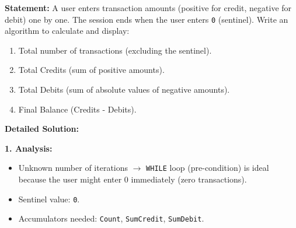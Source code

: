 \documentclass[11pt]{article}
\begin{document}
\begin{exoresolu}
\textbf{Statement:} A user enters transaction amounts (positive for credit, negative for debit) one by one. The session ends when the user enters \texttt{0} (sentinel). Write an algorithm to calculate and display:
\begin{enumerate}
    \item Total number of transactions (excluding the sentinel).
    \item Total Credits (sum of positive amounts).
    \item Total Debits (sum of absolute values of negative amounts).
    \item Final Balance (Credits - Debits).
\end{enumerate}
\tcblower
\textbf{Detailed Solution:}

\noindent\textbf{1. Analysis:}
\begin{itemize}
    \item Unknown number of iterations $\rightarrow$ \texttt{WHILE} loop (pre-condition) is ideal because the user might enter 0 immediately (zero transactions).
    \item Sentinel value: \texttt{0}.
    \item Accumulators needed: \texttt{Count}, \texttt{SumCredit}, \texttt{SumDebit}.
\end{itemize}


\end{exoresolu}
\end{document}
